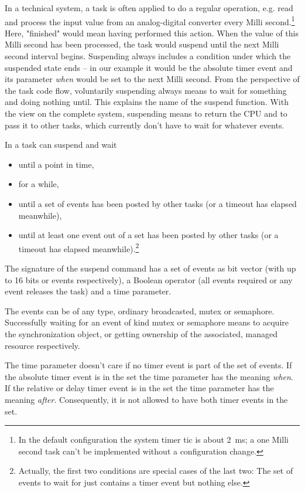 In a technical system, a task is often applied to do a regular operation,
e.g. read and process the input value from an analog-digital converter
every Milli second.\footnote{In the \rtos{} default configuration the
system timer tic is about 2~ms; a one Milli second task can't be
implemented without a configuration change.} Here, "finished" would mean
having performed this action. When the value of this Milli second has been
processed, the task would suspend until the next Milli second interval
begins. Suspending always includes a condition under which the suspended
state ends -- in our example it would be the absolute timer event and its
parameter \emph{when} would be set to the next Milli second. From the
perspective of the task code flow, voluntarily suspending always means to
wait for something and doing nothing until. This explains the name of the
suspend function. With the view on the complete system, suspending means
to return the CPU and to pass it to other tasks, which currently don't
have to wait for whatever events.

In \rtos{} a task can suspend and wait
\begin{itemize}
  \item until a point in time,
  \item for a while,
  \item until a set of events has been posted by other tasks (or a timeout
    has elapsed meanwhile),
  \item until at least one event out of a set has been posted by other
    tasks (or a timeout has elapsed meanwhile).\footnote{Actually, the
    first two conditions are special cases of the last two: The set of
    events to wait for just contains a timer event but nothing else.}
\end{itemize}

The signature of the suspend command has a set of events as bit vector
(with up to 16 bits or events respectively), a Boolean operator (all events
required or any event releases the task) and a time parameter.

The events can be of any type, ordinary broadcasted, mutex or semaphore.
Successfully waiting for an event of kind mutex or semaphore means to
acquire the synchronization object, or getting ownership of the
associated, managed resource respectively.

The time parameter doesn't care if no timer event is part of the set of
events. If the absolute timer event is in the set the time parameter has
the meaning \emph{when}. If the relative or delay timer event is in the
set the time parameter has the meaning \emph{after}. Consequently, it is
not allowed to have both timer events in the set.

